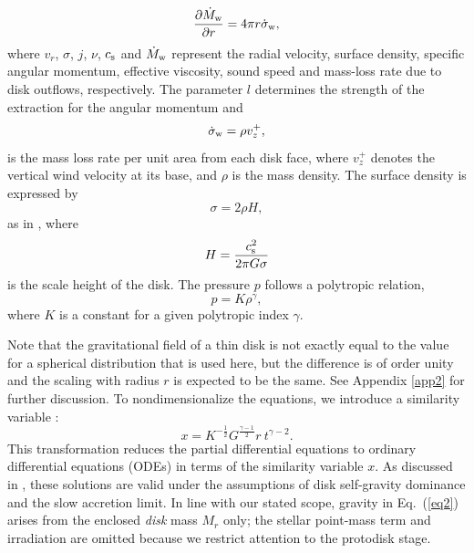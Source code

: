 \documentclass[twocolumn,linenumbers]{aastex631}
\begin{document}
\begin{equation}
\frac{\partial \dot{M}_{\rm w}}{\partial r}=4 \pi r \dot{\sigma}_{\rm w},
\label{eq4}
\end{equation}
where $v_{r}$, $\sigma$, $j$, ${\nu}$, \textbf{$c_{\rm s}$} and $\dot{M}_{\rm w}$ represent the radial velocity, surface density, specific angular momentum, effective viscosity, sound speed and mass-loss rate due to disk outflows, respectively.
The parameter ${l}$ determines the strength of the extraction for the angular momentum and 
\begin{equation}
\dot{\sigma}_{\rm w}=\rho v_{z}^{+},
\label{eq5}
\end{equation}
is the mass loss rate per unit area from each disk face, where $v_{z}^{+}$ denotes the vertical wind velocity at its base, and $\rho$ is the mass density. The surface density is expressed by 
\begin{equation}
\sigma = 2\rho H,
\label{surface density}
\end{equation}
as in \cite{abbassi2013viscous}, where
\begin{equation}
H=\frac{c_{\rm s}^2}{2\pi G \sigma}
\label{eq6}
\end{equation}
is the scale height of the disk.
The pressure $p$ follows a polytropic relation,
\begin{equation}
p=K\rho^{\gamma},
\label{eq7}
\end{equation}
where $K$ is a constant for a given polytropic index $\gamma$.

Note that the gravitational field of a thin disk is not exactly equal to the value for a spherical distribution that is used here, but the difference is of order unity and the scaling with radius $r$ is expected to be the same. See Appendix \ref{app2} for further discussion.
To nondimensionalize the equations, we introduce a similarity variable \citep{yahil1983self, mineshige1997self}:
\begin{equation}
x = K^{-\frac{1}{2}}G^{\frac{\gamma-1}{2}} r ~ t^{\gamma-2}.
\label{eq8}
\end{equation}
This transformation reduces the partial differential equations to ordinary differential equations (ODEs) in terms of the similarity variable $x$. As discussed in \citet{abbassi2013viscous}, these solutions are valid under the assumptions of disk self-gravity dominance and the slow accretion limit. In line with our stated scope, gravity in Eq.~(\ref{eq2}) arises from the enclosed \emph{disk} mass $M_r$ only; the stellar point-mass term and irradiation are omitted because we restrict attention to the protodisk stage.
\end{document}
